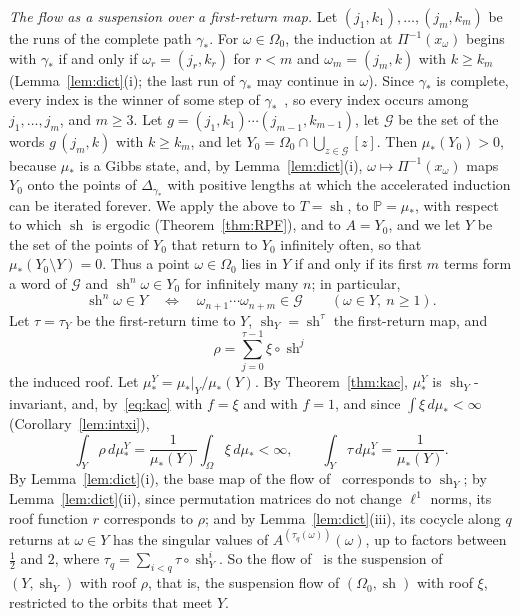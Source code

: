 \documentclass[11pt]{amsart}
\theoremstyle{definition}
\theoremstyle{remark}
\begin{document}
\emph{The flow as a suspension over a first-return map.}
Let $(j_1,k_1),\dots,(j_m,k_m)$ be the runs of the complete path $\gamma_*$. For $\omega\in\Omega_0$, the induction at $\Pi^{-1}(x_\omega)$ begins with $\gamma_*$ if and only if $\omega_r=(j_r,k_r)$ for $r<m$ and $\omega_m=(j_m,k)$ with $k\ge k_m$ (Lemma~\ref{lem:dict}(i); the last run of $\gamma_*$ may continue in $\omega$). Since $\gamma_*$ is complete, every index is the winner of some step of $\gamma_*$~\cite[Def.~8]{AHSinv}, so every index occurs among $j_1,\dots,j_m$, and $m\ge3$. Let $g=(j_1,k_1)\cdots(j_{m-1},k_{m-1})$, let $\mathcal G$ be the set of the words $g\,(j_m,k)$ with $k\ge k_m$, and let $Y_0=\Omega_0\cap\bigcup_{z\in\mathcal G}[z]$. Then $\mu_*(Y_0)>0$, because $\mu_*$ is a Gibbs state, and, by Lemma~\ref{lem:dict}(i), $\omega\mapsto\Pi^{-1}(x_\omega)$ maps $Y_0$ onto the points of $\Delta_{\gamma_*}$ with positive lengths at which the accelerated induction can be iterated forever. We apply the above to $T=\operatorname{sh}$, to $\mathbb P=\mu_*$, with respect to which $\operatorname{sh}$ is ergodic (Theorem~\ref{thm:RPF}), and to $A=Y_0$, and we let $Y$ be the set of the points of $Y_0$ that return to $Y_0$ infinitely often, so that $\mu_*(Y_0\setminus Y)=0$. Thus a point $\omega\in\Omega_0$ lies in $Y$ if and only if its first $m$ terms form a word of $\mathcal G$ and $\operatorname{sh}^n\omega\in Y_0$ for infinitely many $n$; in particular,
\begin{equation}\label{eq:returnY}
  \operatorname{sh}^n\omega\in Y\quad\Longleftrightarrow\quad\omega_{n+1}\cdots\omega_{n+m}\in\mathcal G\qquad(\omega\in Y,\ n\ge1).
\end{equation}
Let $\tau=\tau_Y$ be the first-return time to $Y$, $\operatorname{sh}_Y=\operatorname{sh}^\tau$ the first-return map, and
\[
  \rho=\sum_{j=0}^{\tau-1}\xi\circ\operatorname{sh}^j
\]
the induced roof. Let $\mu_*^Y=\mu_*|_Y/\mu_*(Y)$. By Theorem~\ref{thm:kac}, $\mu_*^Y$ is $\operatorname{sh}_Y$-invariant, and, by~\eqref{eq:kac} with $f=\xi$ and with $f=1$, and since $\int\xi\,d\mu_*<\infty$ (Corollary~\ref{lem:intxi}),
\begin{equation}\label{eq:kacY}
  \int_Y\rho\,d\mu_*^Y=\frac1{\mu_*(Y)}\int_\Omega\xi\,d\mu_*<\infty,\qquad\int_Y\tau\,d\mu_*^Y=\frac1{\mu_*(Y)} .
\end{equation}
By Lemma~\ref{lem:dict}(i), the base map of the flow of~\cite{AHSinv} corresponds to $\operatorname{sh}_Y$; by Lemma~\ref{lem:dict}(ii), since permutation matrices do not change $\ell^1$ norms, its roof function $r$ corresponds to $\rho$; and by Lemma~\ref{lem:dict}(iii), its cocycle along $q$ returns at $\omega\in Y$ has the singular values of $A^{(\tau_q(\omega))}(\omega)$, up to factors between $\frac12$ and $2$, where $\tau_q=\sum_{i<q}\tau\circ\operatorname{sh}_Y^i$. So the flow of~\cite{AHSinv} is the suspension of $(Y,\operatorname{sh}_Y)$ with roof $\rho$, that is, the suspension flow of $(\Omega_0,\operatorname{sh})$ with roof $\xi$, restricted to the orbits that meet $Y$.
\end{document}
